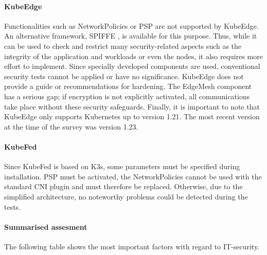 \documentclass[MIC,Master,english]{twbook}%
\begin{document}
\paragraph{KubeEdge} Functionalities such as NetworkPolicies or \ac{PSP} are not supported by KubeEdge. An alternative framework, SPIFFE \cite{ke-secure-fw}, is available for this purpose. Thus, while it can be used to check and restrict many security-related aspects such as the integrity of the application and workloads or even the nodes, it also requires more effort to implement. Since specially developed components are used, conventional security tests cannot be applied or have no significance. KubeEdge does not provide a guide or recommendations for hardening. The EdgeMesh component has a serious gap; if encryption is not explicitly activated, all communications take place without these security safeguards. Finally, it is important to note that KubeEdge only supports Kubernetes up to version 1.21. The most recent version at the time of the survey was version 1.23.

\paragraph{KubeFed} Since KubeFed is based on K3s, some parameters must be specified during installation. \ac{PSP} must be activated, the NetworkPolicies cannot be used with the standard \ac{CNI} plugin and must therefore be replaced. Otherwise, due to the simplified architecture, no noteworthy problems could be detected during the tests.

\paragraph{Summarised assesment} The following table shows the most important factors with regard to IT-security.
\end{document}
